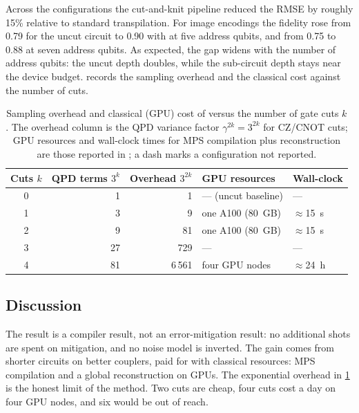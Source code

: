Across the configurations the cut-and-knit pipeline reduced the RMSE by roughly 15\% relative to standard transpilation. For image encodings the fidelity rose from 0.79 for the uncut \qcrank{} circuit to 0.90 with \shardq{} at five address qubits, and from 0.75 to 0.88 at seven address qubits. As expected, the gap widens with the number of address qubits: the uncut depth doubles, while the sub-circuit depth stays near the device budget.  records the sampling overhead and the classical cost against the number of cuts.

\begin{table}[htbp]
\caption{Sampling overhead and classical (GPU) cost of \shardq{} versus the number of gate cuts $k$. The overhead column is the QPD variance factor $\gamma^{2k} = 3^{2k}$ for CZ/CNOT cuts; GPU resources and wall-clock times for MPS compilation plus reconstruction are those reported in \cite{guo2025shardq}; a dash marks a configuration not reported.}\label{tab:qml:shardq-overhead}
\centering
\small
\begin{tabular}{@{}crrll@{}}
\toprule
Cuts $k$ & QPD terms $3^{k}$ & Overhead $3^{2k}$ & GPU resources & Wall-clock \\
\midrule
0 & 1 & 1 & --- (uncut baseline) & --- \\
1 & 3 & 9 & one A100 (\SI{80}{GB}) & $\approx$\SI{15}{\second} \\
2 & 9 & 81 & one A100 (\SI{80}{GB}) & $\approx$\SI{15}{\second} \\
3 & 27 & 729 & --- & --- \\
4 & 81 & 6\,561 & four GPU nodes & $\approx$\SI{24}{\hour} \\
\bottomrule
\end{tabular}
\end{table}

\subsection{Discussion}\label{sec:qml:shardq:discussion}

The result is a compiler result, not an error-mitigation result: no additional shots are spent on mitigation, and no noise model is inverted. The gain comes from shorter circuits on better couplers, paid for with classical resources: MPS compilation and a global reconstruction on GPUs. The exponential overhead in \cref{tab:qml:shardq-overhead} is the honest limit of the method. Two cuts are cheap, four cuts cost a day on four GPU nodes, and six would be out of reach.

